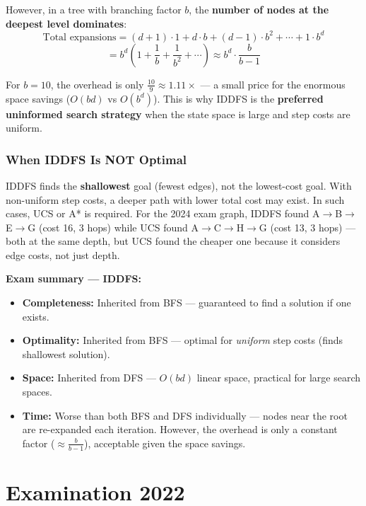 \documentclass[12pt, a4paper]{article}
\newenvironment{notesbox}{\begin{mdframed}[style=notesframe]}{\end{mdframed}}
\begin{document}
However, in a tree with branching factor $b$, the \textbf{number of nodes at the deepest level dominates}:
\[
\text{Total expansions} = (d{+}1) \cdot 1 + d \cdot b + (d{-}1) \cdot b^2 + \cdots + 1 \cdot b^d
\]
\[
= b^d \left(1 + \frac{1}{b} + \frac{1}{b^2} + \cdots\right)
\approx b^d \cdot \frac{b}{b-1}
\]

For $b=10$, the overhead is only $\frac{10}{9} \approx 1.11\times$ — a small price for the enormous space savings ($O(bd)$ vs $O(b^d)$). This is why IDDFS is the \textbf{preferred uninformed search strategy} when the state space is large and step costs are uniform.

\subsubsection*{When IDDFS Is NOT Optimal}

IDDFS finds the \textbf{shallowest} goal (fewest edges), not the lowest-cost goal. With non-uniform step costs, a deeper path with lower total cost may exist. In such cases, UCS or A* is required. For the 2024 exam graph, IDDFS found A$\to$B$\to$E$\to$G (cost 16, 3 hops) while UCS found A$\to$C$\to$H$\to$G (cost 13, 3 hops) — both at the same depth, but UCS found the cheaper one because it considers edge costs, not just depth.

\begin{notesbox}
\textbf{Exam summary — IDDFS:}
\begin{itemize}[noitemsep,topsep=2pt]
  \item \textbf{Completeness:} Inherited from BFS — guaranteed to find a solution if one exists.
  \item \textbf{Optimality:} Inherited from BFS — optimal for \emph{uniform} step costs (finds shallowest solution).
  \item \textbf{Space:} Inherited from DFS — $O(bd)$ linear space, practical for large search spaces.
  \item \textbf{Time:} Worse than both BFS and DFS individually — nodes near the root are re-expanded each iteration. However, the overhead is only a constant factor ($\approx \frac{b}{b-1}$), acceptable given the space savings.
\end{itemize}
\end{notesbox}

\newpage
\section{Examination 2022}
\end{document}
